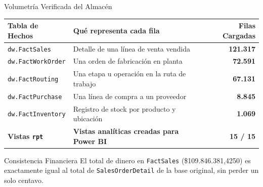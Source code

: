\documentclass[aspectratio=169, 10pt]{beamer}
\begin{document}
\begin{frame}{Volumetría Verificada del Almacén}
    \begin{table}[H]
    \centering
    \small
    \begin{tabularx}{0.92\textwidth}{l X r}
    \toprule
    \textbf{Tabla de Hechos} & \textbf{Qué representa cada fila} & \textbf{Filas Cargadas} \\
    \midrule
    \texttt{dw.FactSales} & Detalle de una línea de venta vendida & \textbf{121.317} \\
    \texttt{dw.FactWorkOrder} & Una orden de fabricación en planta & \textbf{72.591} \\
    \texttt{dw.FactRouting} & Una etapa u operación en la ruta de trabajo & \textbf{67.131} \\
    \texttt{dw.FactPurchase} & Una línea de compra a un proveedor & \textbf{8.845} \\
    \texttt{dw.FactInventory} & Registro de stock por producto y ubicación & \textbf{1.069} \\
    \midrule
    \textbf{Vistas \texttt{rpt}} & \textbf{Vistas analíticas creadas para Power BI} & \textbf{15 / 15} \\
    \bottomrule
    \end{tabularx}
    \end{table}
    
    \vspace{0.2cm}
    \begin{exampleblock}{Consistencia Financiera}
        \small
        El total de dinero en \texttt{FactSales} (\$109.846.381,4250) es exactamente igual al total de \texttt{SalesOrderDetail} de la base original, sin perder un solo centavo.
    \end{exampleblock}
\end{frame}
\end{document}
